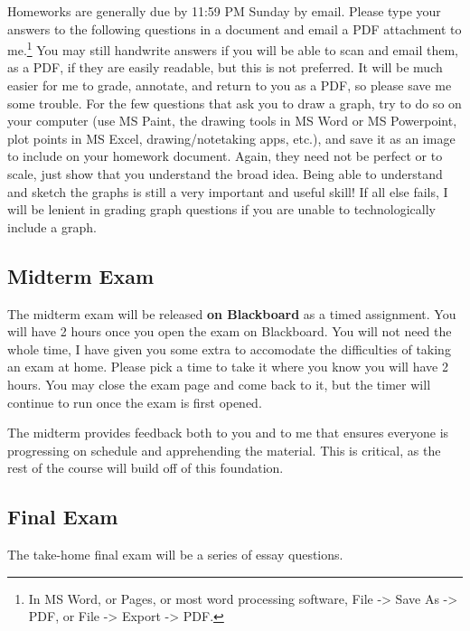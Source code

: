 \documentclass{article}
\begin{document}
Homeworks are generally due by 11:59 PM Sunday by email. Please type
your answers to the following questions in a document and email a PDF
attachment to me.\footnote{In MS Word, or Pages, or most word processing
  software, File -\textgreater{} Save As -\textgreater{} PDF, or File
  -\textgreater{} Export -\textgreater{} PDF.} You may still handwrite
answers if you will be able to scan and email them, as a PDF, if they
are easily readable, but this is not preferred. It will be much easier
for me to grade, annotate, and return to you as a PDF, so please save me
some trouble. For the few questions that ask you to draw a graph, try to
do so on your computer (use MS Paint, the drawing tools in MS Word or MS
Powerpoint, plot points in MS Excel, drawing/notetaking apps, etc.), and
save it as an image to include on your homework document. Again, they
need not be perfect or to scale, just show that you understand the broad
idea. Being able to understand and sketch the graphs is still a very
important and useful skill! If all else fails, I will be lenient in
grading graph questions if you are unable to technologically include a
graph.

\hypertarget{midterm-exam}{%
\subsection*{Midterm Exam}\label{midterm-exam}}

The midterm exam will be released \textbf{on Blackboard} as a timed
assignment. You will have 2 hours once you open the exam on Blackboard.
You will not need the whole time, I have given you some extra to
accomodate the difficulties of taking an exam at home. Please pick a
time to take it where you know you will have 2 hours. You may close the
exam page and come back to it, but the timer will continue to run once
the exam is first opened.

The midterm provides feedback both to you and to me that ensures
everyone is progressing on schedule and apprehending the material. This
is critical, as the rest of the course will build off of this
foundation.

\hypertarget{final-exam}{%
\subsection*{Final Exam}\label{final-exam}}

The take-home final exam will be a series of essay questions.
\end{document}
